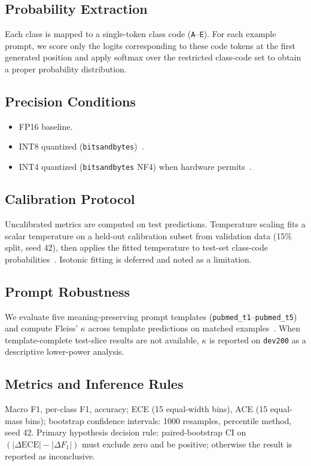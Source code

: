 \documentclass[conference]{IEEEtran}
\begin{document}
\subsection{Probability Extraction}
Each class is mapped to a single-token class code (\texttt{A}--\texttt{E}).
For each example prompt, we score only the logits corresponding to these code tokens at the first generated position and apply softmax over the restricted class-code set to obtain a proper probability distribution.

\subsection{Precision Conditions}
\begin{itemize}
  \item FP16 baseline.
  \item INT8 quantized (\texttt{bitsandbytes})~\cite{dettmers2023qlora,dettmers2022llmint8}.
  \item INT4 quantized (\texttt{bitsandbytes} NF4) when hardware permits~\cite{dettmers2023qlora}.
\end{itemize}

\subsection{Calibration Protocol}
Uncalibrated metrics are computed on test predictions.
Temperature scaling fits a scalar temperature on a held-out calibration subset from validation data (15\% split, seed 42), then applies the fitted temperature to test-set class-code probabilities~\cite{guo2017,zadrozny2002}.
Isotonic fitting is deferred and noted as a limitation.

\subsection{Prompt Robustness}
We evaluate five meaning-preserving prompt templates (\texttt{pubmed\_t1}--\texttt{pubmed\_t5}) and compute Fleiss' $\kappa$ across template predictions on matched examples~\cite{fleiss1971}.
When template-complete test-slice results are not available, $\kappa$ is reported on \texttt{dev200} as a descriptive lower-power analysis.

\subsection{Metrics and Inference Rules}
Macro F1, per-class F1, accuracy; ECE (15 equal-width bins), ACE (15 equal-mass bins); bootstrap confidence intervals: 1000 resamples, percentile method, seed 42.
Primary hypothesis decision rule: paired-bootstrap CI on $(|\Delta\mathrm{ECE}| - |\Delta F_1|)$ must exclude zero and be positive; otherwise the result is reported as inconclusive.
\end{document}
